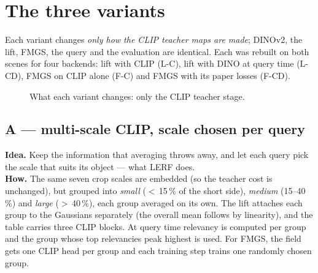 \documentclass[11pt,a4paper]{article}
\begin{document}
\section{The three variants}

Each variant changes \emph{only how the CLIP teacher maps are made}; DINOv2, the lift, FMGS, the query and the
evaluation are identical. Each was rebuilt on both scenes for four backends: lift with CLIP (L-C), lift with
DINO at query time (L-CD), FMGS on CLIP alone (F-C) and FMGS with its paper losses (F-CD).

\begin{figure}[ht]
\centering
{}
\caption{What each variant changes: only the CLIP teacher stage.}
\end{figure}

\subsection{A --- multi-scale CLIP, scale chosen per query}
\textbf{Idea.} Keep the information that averaging throws away, and let each query pick the scale that suits its
object --- what LERF does.\\
\textbf{How.} The same seven crop scales are embedded (so the teacher cost is unchanged), but grouped into
\emph{small} ($<$\,15\,\% of the short side), \emph{medium} (15--40\,\%) and \emph{large} ($>$\,40\,\%), each group
averaged on its own. The lift attaches each group to the Gaussians separately (the overall mean follows by
linearity), and the table carries three CLIP blocks. At query time relevancy is computed per group and the group
whose top relevancies peak highest is used. For FMGS, the field gets one CLIP head per group and each training
step trains one randomly chosen group.
\end{document}

